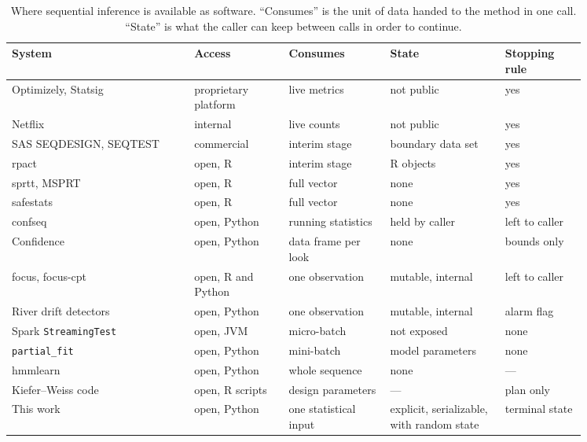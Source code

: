 \documentclass[11pt,a4paper]{article}
\theoremstyle{definition}
\theoremstyle{remark}
\newcommand{\code}[1]{\texttt{#1}}
\begin{document}
\begin{table}[t]
\centering
\small
\caption{
Where sequential inference is available as software. ``Consumes'' is the
unit of data handed to the method in one call. ``State'' is what the
caller can keep between calls in order to continue.
}
\label{tab:landscape}
\begin{tabular}{
    >{\raggedright\arraybackslash}p{0.27\linewidth}
    >{\raggedright\arraybackslash}p{0.14\linewidth}
    >{\raggedright\arraybackslash}p{0.15\linewidth}
    >{\raggedright\arraybackslash}p{0.17\linewidth}
    >{\raggedright\arraybackslash}p{0.12\linewidth}}
\toprule
\textbf{System} & \textbf{Access} & \textbf{Consumes} & \textbf{State} & \textbf{Stopping rule} \\
\midrule
Optimizely, Statsig \cite{johari2017,zhao2019}
    & proprietary platform & live metrics & not public & yes \\
Netflix \cite{lindon2022}
    & internal & live counts & not public & yes \\
SAS SEQDESIGN, SEQTEST \cite{sas}
    & commercial & interim stage & boundary data set & yes \\
rpact \cite{rpact}
    & open, R & interim stage & R objects & yes \\
sprtt, MSPRT \cite{schnuerch2020,pramanik2021}
    & open, R & full vector & none & yes \\
safestats \cite{grunwald2024}
    & open, R & full vector & none & yes \\
\addlinespace
confseq \cite{howard2021}
    & open, Python & running statistics & held by caller & left to caller \\
Confidence \cite{spotifyconfidence}
    & open, Python & data frame per look & none & bounds only \\
focus, focus-cpt \cite{romano2026}
    & open, R and Python & one observation & mutable, internal & left to caller \\
River drift detectors \cite{montiel2021}
    & open, Python & one observation & mutable, internal & alarm flag \\
Spark \code{StreamingTest} \cite{spark}
    & open, JVM & micro-batch & not exposed & none \\
\addlinespace
\code{partial\_fit} \cite{buitinck2013}
    & open, Python & mini-batch & model parameters & none \\
hmmlearn \cite{hmmlearn}
    & open, Python & whole sequence & none & --- \\
Kiefer--Weiss code \cite{novikov2022a}
    & open, R scripts & design parameters & --- & plan only \\
\addlinespace
This work
    & open, Python & one statistical input & explicit, serializable, with random state & terminal state \\
\bottomrule
\end{tabular}
\end{table}
\end{document}
